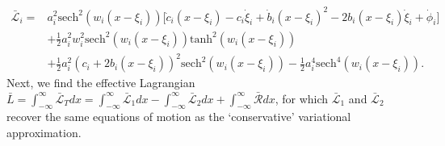\begin{align}
\bar{\mathcal{L}}_i =& a_i^2 \mathrm{sech}^2(w_i(x-\xi_i))\Bigg[\dot{c}_i(x-\xi_i)-c_i\dot{\xi}_i + \dot{b}_i(x-\xi_i)^2 - 2b_i (x-\xi_i) \dot{\xi}_i + \dot{\phi}_i \Bigg]  \nonumber \\
&+ \frac{1}{2}a_i^2 w_i^2 \mathrm{sech}^2(w_i(x-\xi_i))\mathrm{tanh}^2(w_i(x-\xi_i)) \nonumber \\
&+\frac{1}{2} a_i^2  (c_i+2 b_i (x-\xi_i))^2 \mathrm{sech}^2(w_i(x-\xi_i)) 
- \frac{1}{2} a_i^4 \mathrm{sech}^4(w_i(x-\xi_i)). \label{eq:cLi} 
\end{align}
Next, we find the effective Lagrangian $\bar{L} = \int_{-\infty}^{\infty} \bar{\mathcal{L}}_T dx = \int_{-\infty}^{\infty} \bar{\mathcal{L}}_1 dx - \int_{-\infty}^{\infty} \bar{\mathcal{L}}_2 dx + \int_{-\infty}^{\infty} \bar{\mathcal{R}} dx$, for which $\bar{\mathcal{L}}_1$ and $\bar{\mathcal{L}}_2$ recover the same equations of motion as the `conservative' variational approximation.  
 

